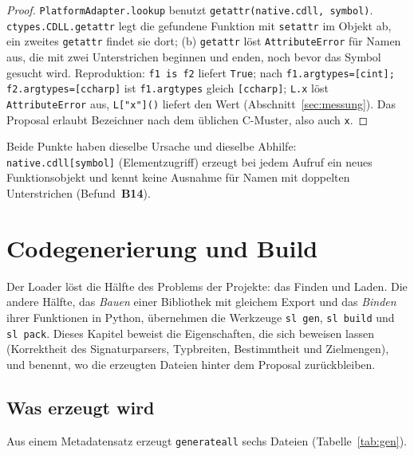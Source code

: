\documentclass[a4paper,12pt,twoside]{report}
\DeclareRobustCommand{\_}{\ifmmode\mbox{\textunderscore}\else\textunderscore\allowbreak{}\fi}
\theoremstyle{definition}
\newcommand{\Bf}[1]{\textbf{B#1}}
\begin{document}
\begin{proof}
	\texttt{PlatformAdapter.lookup} benutzt \texttt{getattr(native.cdll, symbol)}. \texttt{ctypes.CDLL.\_\_getattr\_\_} legt die gefundene Funktion mit \texttt{setattr} im Objekt ab, ein zweites \texttt{getattr} findet sie dort; (b) \texttt{\_\_getattr\_\_} löst \texttt{AttributeError} für Namen aus, die mit zwei Unterstrichen beginnen und enden, noch bevor das Symbol gesucht wird. Reproduktion: \texttt{f1 is f2} liefert \texttt{True}; nach \texttt{f1.argtypes=[c\_int]; f2.argtypes=[c\_char\_p]} ist \texttt{f1.argtypes} gleich \texttt{[c\_char\_p]}; \texttt{L.\_\_x\_\_} löst \texttt{AttributeError} aus, \texttt{L["\_\_x\_\_"]()} liefert den Wert (Abschnitt~\ref{sec:messung}). Das Proposal erlaubt Bezeichner nach dem üblichen C-Muster, also auch \texttt{\_\_x\_\_}.
\end{proof}

Beide Punkte haben dieselbe Ursache und dieselbe Abhilfe: \texttt{native.cdll[symbol]} (Elementzugriff) erzeugt bei jedem Aufruf ein neues Funktionsobjekt und kennt keine Ausnahme für Namen mit doppelten Unterstrichen (Befund~\Bf{14}).


\chapter{Codegenerierung und Build}
\label{chap:codegen}

Der Loader löst die Hälfte des Problems der Projekte: das Finden und Laden. Die andere Hälfte, das \emph{Bauen} einer Bibliothek mit gleichem Export und das \emph{Binden} ihrer Funktionen in Python, übernehmen die Werkzeuge \texttt{sl gen}, \texttt{sl build} und \texttt{sl pack}. Dieses Kapitel beweist die Eigenschaften, die sich beweisen lassen (Korrektheit des Signaturparsers, Typbreiten, Bestimmtheit und Zielmengen), und benennt, wo die erzeugten Dateien hinter dem Proposal zurückbleiben.

\section{Was erzeugt wird}

Aus einem Metadatensatz erzeugt \texttt{generate\_all} sechs Dateien (Tabelle~\ref{tab:gen}).
\end{document}
